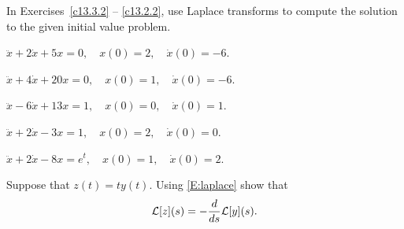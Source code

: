 \documentclass{ximera}
\begin{document}
\noindent In Exercises~\ref{c13.3.2} -- \ref{c13.2.2}, use Laplace transforms 
to compute the solution to the given initial value problem.
\begin{exercise} \label{c13.3.2}
$\ddot{x} + 2\dot x +5x = 0, \quad x(0) = 2, \quad \dot{x}(0) = -6$.
\end{exercise}
\begin{exercise} \label{c13.4.3a}
$\ddot x +4\dot x +20 x=0,\quad x(0)=1,\quad \dot{x}(0)=-6$.
\end{exercise}
\begin{exercise} \label{c13.4.3b}
$\ddot x -6\dot x +13 x=1,\quad x(0)=0,\quad \dot{x}(0)=1$.
\end{exercise}
\begin{exercise} \label{c13.2.1}
$\ddot{x} + 2\dot{x} - 3x  =  1, \quad x(0) = 2, \quad \dot{x}(0) = 0$.
\end{exercise}
\begin{exercise} \label{c13.2.2}
$\ddot{x} + 2\dot{x} - 8x = e^t, \quad x(0) = 1, \quad \dot{x}(0) = 2$.
\end{exercise}

\begin{exercise} \label{c13.1.2}
Suppose that $z(t)=ty(t)$.  Using \eqref{E:laplace} show that
\[
{\cal L}[z](s) = -\frac{\displaystyle d}{\displaystyle ds} {\cal L}[y](s).
\]
\end{exercise}
\end{document}
